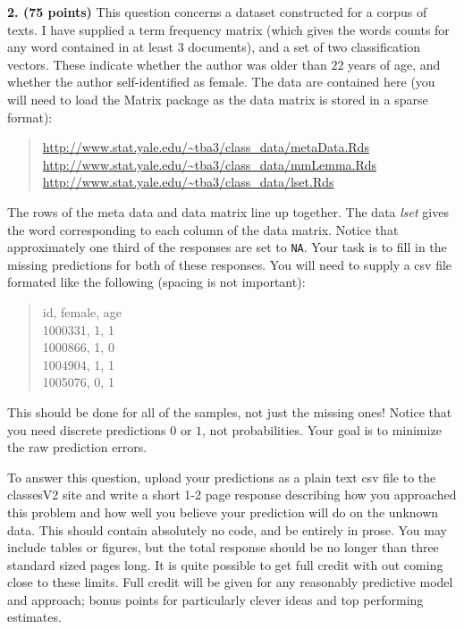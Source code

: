 \documentclass[12pt]{article}
\begin{document}
{\bf 2. (75 points)} This question concerns a dataset constructed for a corpus of texts.
I have supplied a term frequency matrix (which gives the words counts for any word contained
in at least $3$ documents), and a set of two classification vectors. These indicate whether
the author was older than $22$ years of age, and whether the author self-identified as
female. The data are contained here (you will need to load the Matrix package as the
data matrix is stored in a sparse format):
\begin{quote}
\url{http://www.stat.yale.edu/~tba3/class_data/metaData.Rds}\\
\url{http://www.stat.yale.edu/~tba3/class_data/mmLemma.Rds}\\
\url{http://www.stat.yale.edu/~tba3/class_data/lset.Rds}
\end{quote}
The rows of the meta data and data matrix line up together. The data \textit{lset} gives the word
corresponding to each column of the data matrix. Notice that approximately one third of the
responses are set to \texttt{NA}. Your task is
to fill in the missing predictions for both of these responses. You will need to supply
a csv file formated like the following (spacing is not important):
\begin{quote}
id,      female, age\\
1000331,      1, 1\\
1000866,      1, 0\\
1004904,      1, 1\\
1005076,      0, 1
\end{quote}
This should be done for all of the samples, not just the missing ones! Notice that you need
discrete predictions $0$ or $1$, not probabilities. Your goal is to minimize the raw
prediction errors.

To answer this question, upload your predictions as a plain text csv file to the classesV2
site and write a short 1-2 page response describing how you approached this problem and how
well you believe your prediction will do on the unknown data. This should contain absolutely
no code, and be entirely in prose. You may include tables or figures, but the total response
should be no longer than three standard sized pages long. It is quite possible to get full
credit with out coming close to these limits. Full credit will be given for any reasonably
predictive model and approach; bonus points for particularly clever ideas and top performing
estimates.
\end{document}
